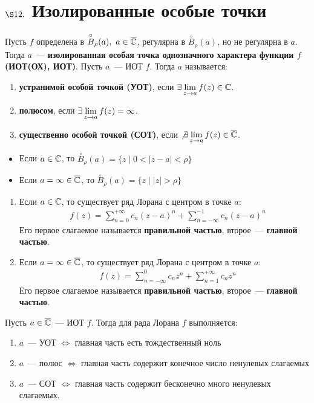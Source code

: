 \section{$\S 12.$ Изолированные особые точки}
\Def
Пусть $f$ определена в $\overset{\circ}{B}_\rho(a), \ a \in \overline{\mathbb{C}}$, регулярна в
$\overset{\circ}{B}_\rho(a)$, но не регулярна в $a$. Тогда $a$~---
\textbf{изолированная особая точка однозначного характера функции $f$ (ИОТ(ОХ),
  ИОТ)}.
\Def
Пусть $a$~--- ИОТ $f$. Тогда $a$ называется:
\begin{enumerate}
    \item \textbf{устранимой особой точкой (УОТ)}, если $\exists \displaystyle \lim_{z
      \to a} f(z) \in \mathbb{C}$.
    \item \textbf{полюсом}, если $\exists \displaystyle \lim_{z \to a}f(z) = \infty$.
    \item \textbf{существенно особой точкой (СОТ)}, если $\not \exists \displaystyle
    \lim_{z \to a} f(z) \in \overline{\mathbb{C}}$.
\end{enumerate}
\begin{itemize}
    \item Если $a \in \mathbb{C}$, то $\overset{\circ}{B}_\rho(a) = \{z \mid 0 < \left|
        z-a \right| < \rho\}$
    \item Если $a = \infty \in \overline{\mathbb{C}}$, то $\overset{\circ}{B}_\rho(a) = \{z \mid
    \left| z \right| > \rho\}$
\end{itemize}
\begin{enumerate}
    \item Если $a \in \mathbb{C}$, то существует ряд Лорана с центром в точке $a$:
    \begin{align*}
      & f(z) = \sum_{n=0}^{+\infty}c_n(z-a)^n + \sum_{n=-\infty}^{-1} c_n(z-a)^n
    \end{align*}
    Его первое слагаемое называется \textbf{правильной частью}, второе~---
    \textbf{главной частью}.
    \item Если $a  = \infty \in \overline{\mathbb{C}}$, то существует ряд Лорана с центром в
    точке $a$:
    \begin{align*}
      & f(z) = \sum_{n=-\infty}^{0}c_nz^n + \sum_{n=1}^{+\infty} c_nz^n
    \end{align*}
    Его первое слагаемое называется \textbf{правильной частью}, второе~---
    \textbf{главной частью}.
\end{enumerate}
\theorem
Пусть $a \in \overline{\mathbb{C}}$~--- ИОТ $f$. Тогда для рада Лорана $f$ выполняется:
\begin{enumerate}
    \item $a$~--- УОТ $\Leftrightarrow$ главная часть есть тождественный ноль
    \item $a$~--- полюс $\Leftrightarrow$ главная часть содержит конечное число
    ненулевых слагаемых
    \item $a$~--- СОТ $\Leftrightarrow$ главная часть содержит бесконечно много
    ненулевых слагаемых.
\end{enumerate}

